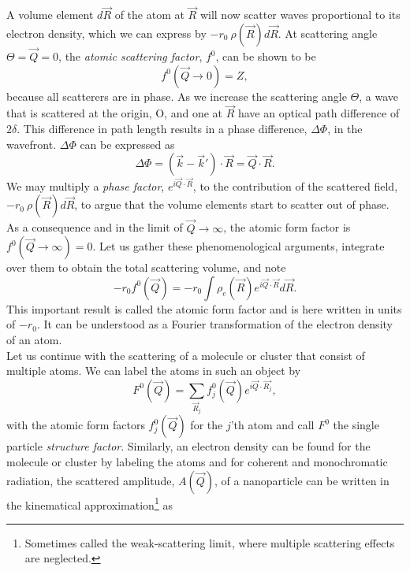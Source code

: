 %
A volume element $d\vec{R}$ of the atom at $\vec{R}$ will now scatter waves proportional to its electron density, which we can express by $-r_{0}\ \rho\left(\vec{R}\right)d\vec{R}$. At scattering angle $\Theta=\vec{Q}=0$, the \textit{atomic scattering factor}, $f^{0}$, can be shown to be
\begin{equation}
f^{0}\left(\vec{Q}\rightarrow 0\right)=Z,
\label{eq:transform-number-of-particles}
\end{equation}
because all scatterers are in phase. As we increase the scattering angle $\Theta$, a wave that is scattered at the origin, O, and one at $\vec{R}$ have an optical path difference of $2 \delta$. This difference in path length results in a phase difference, $\Delta \Phi$, in the wavefront. $\Delta \Phi$ can be expressed as 
\begin{equation}
\Delta \Phi = \left(\vec{k}-\vec{k}'\right)\cdot \vec{R} = \vec{Q}\cdot \vec{R}.
\label{eq:phase-difference}
\end{equation}
We may multiply a \textit{phase factor}, $e^{i \vec{Q}\cdot \vec{R}}$, to the contribution of the scattered field, $-r_{0}\ \rho\left(\vec{R}\right)d\vec{R}$, to argue that the volume elements start to scatter out of phase. As a consequence and in the limit of $\vec{Q}\rightarrow\infty$, the atomic form factor is $f^{0}\left(\vec{Q}\rightarrow\infty\right)=0$. Let us gather these phenomenological arguments, integrate over them to obtain the total scattering volume, and note
\begin{equation}
-r_{0} f^{0}\left(\vec{Q}\right)=-r_{0}\int\rho_{e}\left(\vec{R}\right)e^{i \vec{Q}\cdot \vec{R}}d\vec{R}.
\label{eq:scattering-integral}
\end{equation}
This important result is called the atomic form factor and is here written in units of $-r_{0}$. It can be understood as a Fourier transformation of the electron density of an atom.\\[1\baselineskip]
%
Let us continue with the scattering of a molecule or cluster that consist of multiple atoms. We can label the atoms in such an object by
\begin{equation}
F^{0}\left(\vec{Q}\right)=\sum_{\vec{R}_j}f_{j}^{0}\left(\vec{Q}\right)e^{i \vec{Q}\cdot \vec{R_{j}}},
\label{eq:scattering-factor-object}
\end{equation}
with the atomic form factors $f_{j}^{0}\left(\vec{Q}\right)$ for the $j$'th atom and call $F^{0}$ the single particle \textit{structure factor}. Similarly, an electron density can be found for the molecule or cluster by labeling the atoms \citep{Vartanyants-2001-JOP} and for coherent and monochromatic radiation, the scattered amplitude, $A(\vec{Q})$, of a nanoparticle can be written in the kinematical approximation\footnote{Sometimes called the weak-scattering limit, where multiple scattering effects are neglected.} as 
